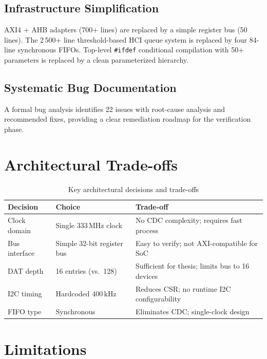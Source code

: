 \documentclass[12pt, a4paper, oneside]{report}
\begin{document}
\subsection{Infrastructure Simplification}

AXI4 + AHB adapters (700+ lines) are replaced by a simple register bus (50 lines).
The 2\,500+ line threshold-based HCI queue system is replaced by four 84-line
synchronous FIFOs. Top-level \texttt{\#ifdef} conditional compilation with 50+
parameters is replaced by a clean parameterized hierarchy.

\subsection{Systematic Bug Documentation}

A formal bug analysis identifies 22 issues with root-cause analysis and recommended
fixes, providing a clear remediation roadmap for the verification phase.

\section{Architectural Trade-offs}

\begin{table}[H]
\centering
\caption{Key architectural decisions and trade-offs}
\label{tab:tradeoffs}
\begin{tabularx}{\textwidth}{L{4cm} L{4cm} L{5cm}}
\toprule
\textbf{Decision} & \textbf{Choice} & \textbf{Trade-off} \\
\midrule
Clock domain   & Single 333\,MHz clock       & No CDC complexity; requires fast process \\
Bus interface  & Simple 32-bit register bus  & Easy to verify; not AXI-compatible for SoC \\
DAT depth      & 16 entries (vs.\ 128)       & Sufficient for thesis; limits bus to 16 devices \\
I2C timing     & Hardcoded 400\,kHz          & Reduces CSR; no runtime I2C configurability \\
FIFO type      & Synchronous                 & Eliminates CDC; single-clock design \\
\bottomrule
\end{tabularx}
\end{table}

\section{Limitations}
\end{document}
